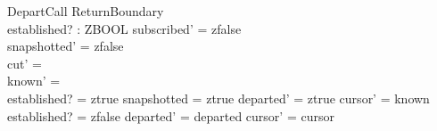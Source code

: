 \documentclass[a4paper,10pt,fleqn]{article}
\begin{document}
\begin{schema}{DepartCall}
  \Delta ReturnBoundary \\
  established? : ZBOOL
\where
  subscribed' = zfalse \\
  snapshotted' = zfalse \\
  cut' = \emptyset \\
  known' = \emptyset \\
  established? = ztrue \implies
    snapshotted = ztrue \land departed' = ztrue \land cursor' = known \\
  established? = zfalse \implies departed' = departed \land cursor' = cursor
\end{schema}
\end{document}
